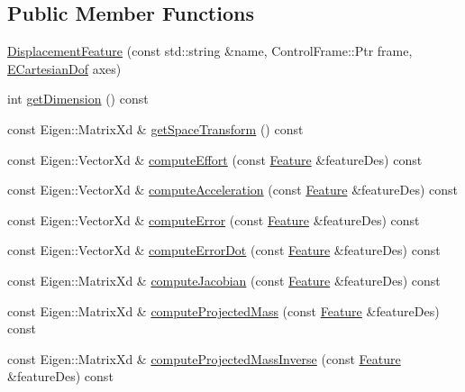 \subsection*{Public Member Functions}
\begin{DoxyCompactItemize}
\item 
\hyperlink{classocra_1_1DisplacementFeature_a9c48bb5ac5d4a856df9c2d879bc4b072}{Displacement\+Feature} (const std\+::string \&name, Control\+Frame\+::\+Ptr frame, \hyperlink{namespaceocra_a436781c7059a0f76027df1c652126260}{E\+Cartesian\+Dof} axes)
\item 
int \hyperlink{classocra_1_1DisplacementFeature_a5d6548c921c2ce61374d3f76114b7881}{get\+Dimension} () const
\item 
const Eigen\+::\+Matrix\+Xd \& \hyperlink{classocra_1_1DisplacementFeature_ad27f4aa83abea99ef893de6043b0bf68}{get\+Space\+Transform} () const
\item 
const Eigen\+::\+Vector\+Xd \& \hyperlink{classocra_1_1DisplacementFeature_a328fae77ec8a9942881e42226250a11b}{compute\+Effort} (const \hyperlink{classocra_1_1Feature}{Feature} \&feature\+Des) const
\item 
const Eigen\+::\+Vector\+Xd \& \hyperlink{classocra_1_1DisplacementFeature_a622cd1b7305b26fbbb2f78784fd0ebf0}{compute\+Acceleration} (const \hyperlink{classocra_1_1Feature}{Feature} \&feature\+Des) const
\item 
const Eigen\+::\+Vector\+Xd \& \hyperlink{classocra_1_1DisplacementFeature_a61d1caacf56e60bb3f33d2c91d5b89f2}{compute\+Error} (const \hyperlink{classocra_1_1Feature}{Feature} \&feature\+Des) const
\item 
const Eigen\+::\+Vector\+Xd \& \hyperlink{classocra_1_1DisplacementFeature_afd5e272957274c46a6331c2a3d3324df}{compute\+Error\+Dot} (const \hyperlink{classocra_1_1Feature}{Feature} \&feature\+Des) const
\item 
const Eigen\+::\+Matrix\+Xd \& \hyperlink{classocra_1_1DisplacementFeature_a87b3ef89ea6711a3f953f94e5cdf7e4d}{compute\+Jacobian} (const \hyperlink{classocra_1_1Feature}{Feature} \&feature\+Des) const
\item 
const Eigen\+::\+Matrix\+Xd \& \hyperlink{classocra_1_1DisplacementFeature_a3c72ecae0cb33a812c66b0770baf09bf}{compute\+Projected\+Mass} (const \hyperlink{classocra_1_1Feature}{Feature} \&feature\+Des) const
\item 
const Eigen\+::\+Matrix\+Xd \& \hyperlink{classocra_1_1DisplacementFeature_a4b2e46d41b46c9af72f21f6dcdeec5f5}{compute\+Projected\+Mass\+Inverse} (const \hyperlink{classocra_1_1Feature}{Feature} \&feature\+Des) const

\end{DoxyCompactItemize}
